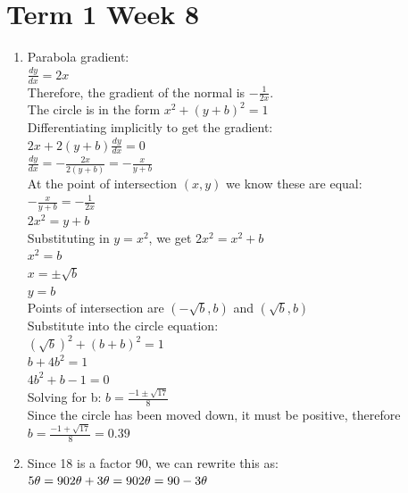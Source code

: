 \documentclass[../main.tex]{subfiles}
\begin{document}
\section*{Term 1 Week 8}
\begin{enumerate}
    \item 
    Parabola gradient:\\
    \(\frac{dy}{dx}=2x\)\\
    Therefore, the gradient of the normal is \(-\frac{1}{2x}\).\\

    The circle is in the form \(x^2+(y+b)^2=1\)\\
    Differentiating implicitly to get the gradient:\\
    \(2x+2(y+b)\frac{dy}{dx}=0\)\\
    \(\frac{dy}{dx}=-\frac{2x}{2(y+b)}=-\frac{x}{y+b}\)\\

    At the point of intersection \((x,y)\) we know these are equal:\\
    \(-\frac{x}{y+b}=-\frac{1}{2x}\)\\
    \(2x^2=y+b\)\\

    Substituting in \(y=x^2\), we get \(2x^2=x^2+b\)\\
    \(x^2=b\)\\
    \(x=\pm \sqrt{b}\)\\
    \(y=b\)\\

    Points of intersection are \((-\sqrt{b},b)\) and \((\sqrt{b}, b)\)\\
    Substitute into the circle equation:\\
    \((\sqrt{b})^2+(b+b)^2=1\)\\
    \(b+4b^2=1\)\\
    \(4b^2+b-1=0\)\\
    Solving for b: \(b=\frac{-1\pm \sqrt{17}}{8}\)\\
    
    Since the circle has been moved down, it must be positive, therefore \(b=\frac{-1+ \sqrt{17}}{8}=0.39\)\\

    \item 
    Since 18 is a factor 90, we can rewrite this as:\\
    \(5\theta=90\\
    2\theta + 3\theta=90\\
    2\theta=90-3\theta\)\\


\end{enumerate}
\end{document}
